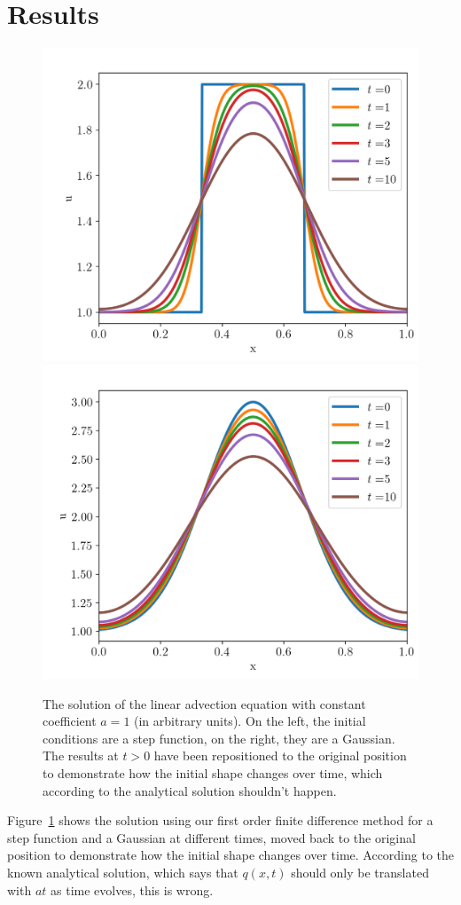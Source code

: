 \section{Results}

\begin{figure}
    \centering
    \includegraphics[width=.5\textwidth]{
    ./figures/advection-1D-step.png}%
    \includegraphics[width=.5\textwidth]{
    ./figures/advection-1D-gaussian.png}%
    \caption{
The solution of the linear advection equation with constant coefficient $a = 1$ (in arbitrary
units). On the left, the initial conditions are a step function, on the right, they are a
Gaussian. The results at $t > 0$ have been repositioned to the original position to demonstrate
how the initial shape changes over time, which according to the analytical solution shouldn't
happen.
    }%
    \label{fig:linear-advection-results}
\end{figure}

Figure~\ref{fig:linear-advection-results} shows the solution using our first 
order finite difference method for a step function and a Gaussian at different 
times, moved back to the original position to demonstrate how the initial shape 
changes over time. According to the known analytical solution, which says that
$q(x, t)$ should only be translated with $a t$ as time evolves, this is wrong.

